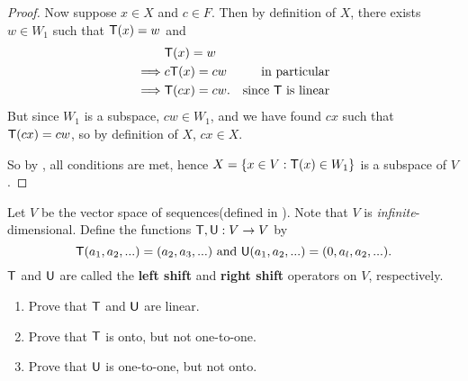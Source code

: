 \begin{proof}
Now suppose \(x \in X\) and \(c \in F\).
Then by definition of \(X\), there exists \(w \in W_1\) such that \(\textsf{T}(x) = w\) and
\begin{align*}
             & \textsf{T}(x) = w \\
    \implies & c\textsf{T}(x) = cw & \text{in particular} \\
    \implies & \textsf{T}(cx) = cw. & \text{since \(\textsf{T}\) is linear}
\end{align*}
But since \(W_1\) is a subspace, \(cw \in W_1\), and we have found \(cx\) such that \(\textsf{T}(cx) = cw\), so by definition of \(X\), \(cx \in X\).

So by , all conditions are met, hence \(X = \{ x \in V: \textsf{T}(x) \in W_1 \}\) is a subspace of \(V\).
\end{proof}

\begin{exercise} \label{exercise 2.1.21}
Let \(V\) be the vector space of sequences(defined in ).
Note that \(V\) is \emph{infinite}-dimensional.
Define the functions \(\textsf{T}, \textsf{U}: V \to V\) by
\[
    \textsf{T}(a_1, a_2, ...) = (a_2, a_3, ...) \text{ and } \textsf{U}(a_1, a_2, ...) = (0, a_l, a_2, ...).
\]
\(\textsf{T}\) and \(\textsf{U}\) are called the \textbf{left shift} and \textbf{right shift} operators on \(V\), respectively.
\begin{enumerate}
\item Prove that \(\textsf{T}\) and \(\textsf{U}\) are linear.
\item Prove that \(\textsf{T}\) is onto, but not one-to-one.
\item Prove that \(\textsf{U}\) is one-to-one, but not onto.
\end{enumerate}
\end{exercise}

